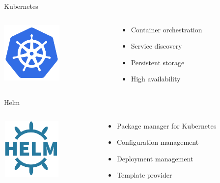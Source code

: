 \documentclass[14pt]{beamer}
\begin{document}
  \begin{frame}{Kubernetes}
    \begin{columns}[c]
      \begin{column}{.3\textwidth}
          \includegraphics[width=3cm,height=3cm]{images/kubernetes_logo.png}
      \end{column}
      \begin{column}{.7\textwidth}
        \begin{itemize}
          \item Container orchestration
          \item Service discovery
          \item Persistent storage
          \item High availability
        \end{itemize}
      \end{column}
    \end{columns}
  \end{frame}

  \begin{frame}{Helm}
    \begin{columns}[c]
      \begin{column}{.3\textwidth}
          \includegraphics[width=3cm,height=3cm]{images/helm_logo.png}
      \end{column}
      \begin{column}{.7\textwidth}
        \begin{itemize}
          \item Package manager for Kubernetes
          \item Configuration management
          \item Deployment management
          \item Template provider
        \end{itemize}
      \end{column}
    \end{columns}
  \end{frame}
\end{document}
